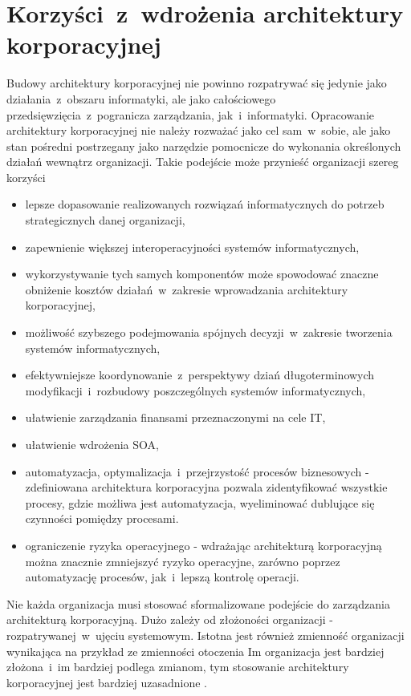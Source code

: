 \section{Korzyści~z~wdrożenia architektury korporacyjnej}
Budowy architektury korporacyjnej nie powinno rozpatrywać się jedynie jako działania~z~obszaru informatyki, ale jako całościowego przedsięwzięcia~z~pogranicza zarządzania, jak~i~informatyki. Opracowanie architektury korporacyjnej nie należy rozważać jako cel sam~w~sobie, ale jako stan pośredni postrzegany jako narzędzie pomocnicze do wykonania określonych działań wewnątrz organizacji. Takie podejście może przynieść organizacji szereg korzyści
\begin{itemize}
\item{lepsze dopasowanie realizowanych rozwiązań informatycznych do potrzeb strategicznych danej organizacji,}
\item{zapewnienie większej interoperacyjności systemów informatycznych,}
\item{wykorzystywanie tych samych komponentów może spowodować znaczne obniżenie kosztów działań~w~zakresie wprowadzania architektury korporacyjnej,}
\item{możliwość szybszego podejmowania spójnych decyzji~w~zakresie tworzenia systemów informatycznych,}
\item{efektywniejsze koordynowanie~z~perspektywy dziań długoterminowych modyfikacji~i~rozbudowy poszczególnych systemów informatycznych,}
\item{ułatwienie zarządzania finansami przeznaczonymi na cele IT,}
\item{ułatwienie wdrożenia SOA,}
\item{automatyzacja, optymalizacja~i~przejrzystość procesów biznesowych - zdefiniowana architektura korporacyjna pozwala zidentyfikować wszystkie procesy, gdzie możliwa jest automatyzacja, wyeliminować dublujące się czynności pomiędzy procesami.}
\item{ograniczenie ryzyka operacyjnego - wdrażając architekturą korporacyjną można znacznie zmniejszyć ryzyko operacyjne, zarówno poprzez automatyzację procesów, jak~i~lepszą kontrolę operacji.}
\end{itemize}

Nie każda organizacja musi stosować sformalizowane podejście do zarządzania architekturą korporacyjną. Dużo zależy od złożoności organizacji - rozpatrywanej~w~ujęciu systemowym. Istotna jest również zmienność organizacji wynikająca na przykład ze zmienności otoczenia Im organizacja jest bardziej złożona~i~im bardziej podlega zmianom, tym stosowanie architektury korporacyjnej jest bardziej uzasadnione \cite{ArchKorpSob}.

